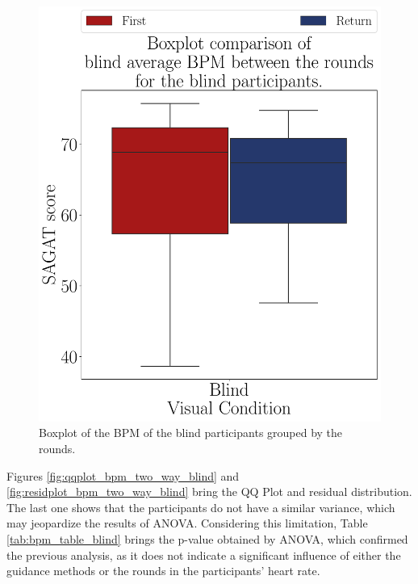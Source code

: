 \begin{figure}[!htb]
\begin{minipage}{0.45\textwidth}
        \includegraphics[width = \textwidth]{Resultados/ECG/Figuras/pdf/boxplot_ecg_bpm_blind_rounds.pdf}
        \caption{Boxplot of the BPM of the blind participants grouped by the rounds.}
        \label{fig:boxplot_ecg_bpm_blind_rounds}
    \end{minipage}
\end{figure}

Figures \ref{fig:qqplot_bpm_two_way_blind} and \ref{fig:residplot_bpm_two_way_blind} bring the QQ Plot and residual distribution. The last one shows that the participants do not have a similar variance, which may jeopardize the results of ANOVA. Considering this limitation, Table \ref{tab:bpm_table_blind} brings the p-value obtained by ANOVA, which confirmed the previous analysis, as it does not indicate a significant influence of either the guidance methods or the rounds in the participants' heart rate. 

